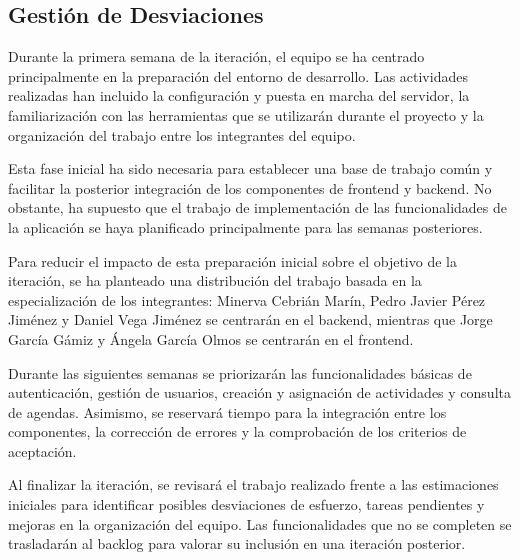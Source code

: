 \subsection{Gestión de Desviaciones}

Durante la primera semana de la iteración, el equipo se ha centrado principalmente en la preparación del entorno de desarrollo. Las actividades realizadas han incluido la configuración y puesta en marcha del servidor, la familiarización con las herramientas que se utilizarán durante el proyecto y la organización del trabajo entre los integrantes del equipo.

Esta fase inicial ha sido necesaria para establecer una base de trabajo común y facilitar la posterior integración de los componentes de frontend y backend. No obstante, ha supuesto que el trabajo de implementación de las funcionalidades de la aplicación se haya planificado principalmente para las semanas posteriores.

Para reducir el impacto de esta preparación inicial sobre el objetivo de la iteración, se ha planteado una distribución del trabajo basada en la especialización de los integrantes: Minerva Cebrián Marín, Pedro Javier Pérez Jiménez y Daniel Vega Jiménez se centrarán en el backend, mientras que Jorge García Gámiz y Ángela García Olmos se centrarán en el frontend.

Durante las siguientes semanas se priorizarán las funcionalidades básicas de autenticación, gestión de usuarios, creación y asignación de actividades y consulta de agendas. Asimismo, se reservará tiempo para la integración entre los componentes, la corrección de errores y la comprobación de los criterios de aceptación.

Al finalizar la iteración, se revisará el trabajo realizado frente a las estimaciones iniciales para identificar posibles desviaciones de esfuerzo, tareas pendientes y mejoras en la organización del equipo. Las funcionalidades que no se completen se trasladarán al backlog para valorar su inclusión en una iteración posterior.